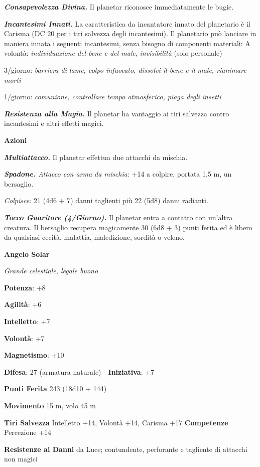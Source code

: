 \begin{multicols}{2}
\emph{\textbf{Consapevolezza Divina.}} Il planetar riconosce
immediatamente le bugie.

\emph{\textbf{Incantesimi Innati.}} La caratteristica da incantatore
innato del planetario è il Carisma (DC 20 per i tiri salvezza degli
incantesimi). Il planetario può lanciare in maniera innata i seguenti
incantesimi, senza bisogno di componenti materiali: A volontà:
\emph{individuazione del bene e del male}, \emph{invisibilità} (solo
personale)

3/giorno: \emph{barriera di lame, colpo infuocato, dissolvi il bene e
il} \emph{male, rianimare morti}

1/giorno: \emph{comunione, controllare tempo atmosferico, piaga degli}
\emph{insetti}

\emph{\textbf{Resistenza alla Magia.}} Il planetar ha vantaggio ai tiri
salvezza contro incantesimi e altri effetti magici.

\textbf{Azioni}

\emph{\textbf{Multiattacco.}} Il planetar effettua due attacchi da
mischia.

\emph{\textbf{Spadone.} Attacco con arma da mischia}: +14 a colpire,
portata 1,5 m, un bersaglio.

\emph{Colpisce:} 21 (4d6 + 7) danni taglienti più 22 (5d8) danni
radianti.

\emph{\textbf{Tocco Guaritore (4/Giorno).}} Il planetar entra a contatto
con un'altra creatura. Il bersaglio recupera magicamente 30 (6d8 + 3)
punti ferita ed è libero da qualsiasi cecità, malattia, maledizione,
sordità o veleno.

\textbf{Angelo Solar}

\emph{Grande celestiale, legale buono}

\textbf{Potenza}: +8

\textbf{Agilità}: +6

\textbf{Intelletto}: +7

\textbf{Volontà}: +7

\textbf{Magnetismo}: +10

\textbf{Difesa}: 27 (armatura naturale) - \textbf{Iniziativa}: +7

\textbf{Punti Ferita} 243 (18d10 + 144)

\textbf{Movimento} 15 m, volo 45 m

\textbf{Tiri Salvezza} Intelletto +14, Volontà +14, Carisma +17
\textbf{Competenze} Percezione +14

\textbf{Resistenze ai Danni} da Luce; contundente, perforante e
tagliente di attacchi non magici


\end{multicols}
